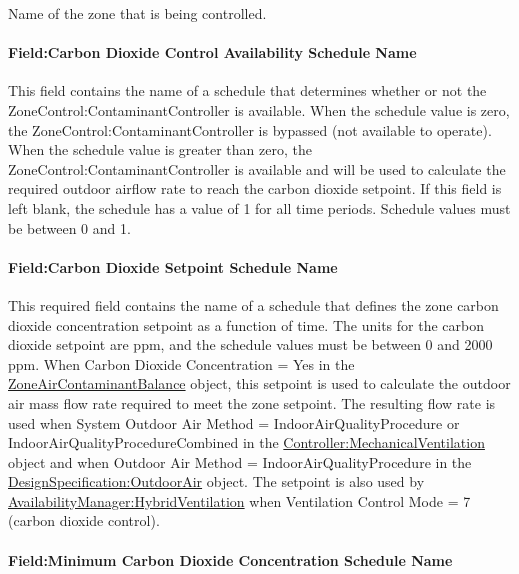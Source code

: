 Name of the zone that is being controlled.

\paragraph{Field:Carbon Dioxide Control Availability Schedule Name}\label{fieldcarbon-dioxide-control-availability-schedule-name}

This field contains the name of a schedule that determines whether or not the ZoneControl:ContaminantController is available. When the schedule value is zero, the ZoneControl:ContaminantController is bypassed (not available to operate). When the schedule value is greater than zero, the ZoneControl:ContaminantController is available and will be used to calculate the required outdoor airflow rate to reach the carbon dioxide setpoint. If this field is left blank, the schedule has a value of 1 for all time periods. Schedule values must be between 0 and 1.

\paragraph{Field:Carbon Dioxide Setpoint Schedule Name}\label{fieldcarbon-dioxide-setpoint-schedule-name}

This required field contains the name of a schedule that defines the zone carbon dioxide concentration setpoint as a function of time. The units for the carbon dioxide setpoint are ppm, and the schedule values must be between 0 and 2000 ppm. When Carbon Dioxide Concentration = Yes in the \hyperref[zoneaircontaminantbalance]{ZoneAirContaminantBalance} object, this setpoint is used to calculate the outdoor air mass flow rate required to meet the zone setpoint. The resulting flow rate is used when System Outdoor Air Method = IndoorAirQualityProcedure or IndoorAirQualityProcedureCombined in the \hyperref[controllermechanicalventilation]{Controller:MechanicalVentilation} object and when Outdoor Air Method = IndoorAirQualityProcedure in the \hyperref[designspecificationoutdoorair]{DesignSpecification:OutdoorAir} object. The setpoint is also used by \hyperref[availabilitymanagerhybridventilation]{AvailabilityManager:HybridVentilation} when Ventilation Control Mode = 7 (carbon dioxide control).

\paragraph{Field:Minimum Carbon Dioxide Concentration Schedule Name}\label{fieldminimum-carbon-dioxide-concentration-schedule-name}

